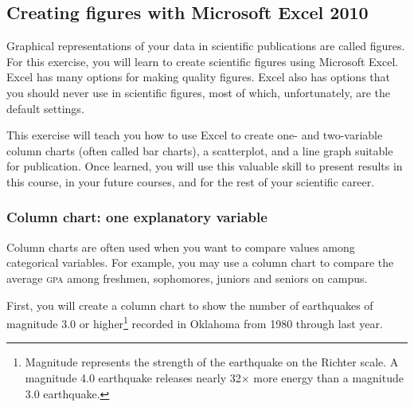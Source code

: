 \documentclass[12pt, hidelinks]{exam}
\begin{document}
\subsection*{Creating figures with Microsoft Excel 2010\texttrademark}

Graphical representations of your data in scientific publications are called figures. For this exercise, you will learn to create scientific figures using Microsoft Excel. Excel has many options for making quality figures. Excel also has options that you should never use in scientific figures, most of which, unfortunately, are the default settings.  

This exercise will teach you how to use Excel to create one- and two-variable column charts (often called bar charts), a scatterplot, and a line graph suitable for publication. Once learned, you will use this valuable skill to present results in this course, in your future courses, and for the rest of your scientific career. 

\subsubsection*{Column chart: one explanatory variable}

Column charts are often used when you want to compare values among categorical variables. For example, you may use a column chart to compare the average \textsc{gpa} among freshmen, sophomores, juniors and seniors on campus. 

First, you will create a column chart to show the number of earthquakes of magnitude 3.0 or higher\footnote{Magnitude represents the strength of the earthquake on the Richter scale. A magnitude 4.0 earthquake releases nearly 32$\times$ more energy than a magnitude 3.0 earthquake.} recorded in Oklahoma from 1980 through last year. \bigskip
\end{document}
